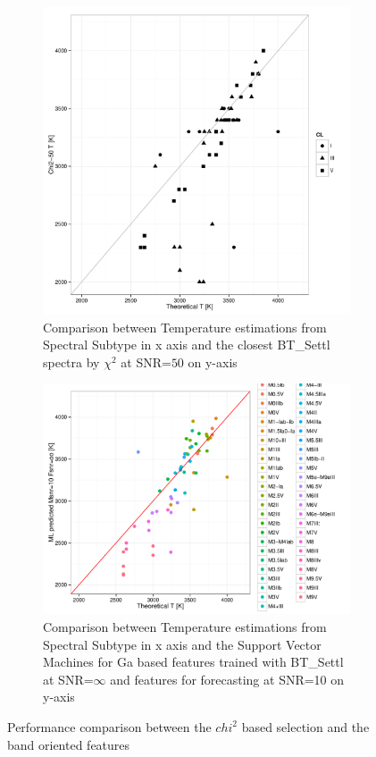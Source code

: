 {\begin {figure}
 \centering
 \begin{subfigure}{.85\textwidth}
  \centering
  \includegraphics[width=13cm]{figs/T_chi50_Tst.pdf}
  \caption{Comparison between Temperature estimations from Spectral Subtype 
 in x axis and the closest BT\_Settl spectra by $\chi^2$ at SNR=$50$ on y-axis}
 \label{fig:chi2_50_spt}
 \end{subfigure}
  \begin{subfigure}{.85\textwidth}
  \centering
  \includegraphics[width=13cm]{figs/T_svm_10_TsP.pdf}
  \caption{Comparison between Temperature estimations from Spectral Subtype 
 in x axis and the Support Vector Machines for Ga based features trained with BT\_Settl 
 at SNR=$\infty$ and features for forecasting at SNR=10 on y-axis}
 \label{fig:ga_too50ga_spt}
 \end{subfigure}
 \label {fig:comp01}
 \caption{Performance comparison between the $chi^2$ based selection 
          and the band oriented features}
\end {figure}
%
%

}
